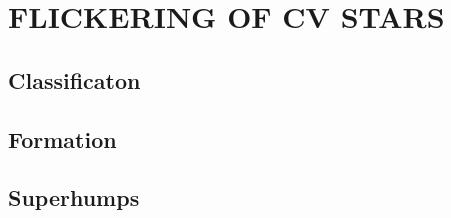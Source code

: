 \chapter{FLICKERING OF CV STARS}
\thispagestyle{empty}

\mquote{}{}

\section{Classificaton}

\section{Formation}

\section{Superhumps}



